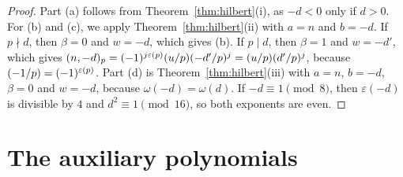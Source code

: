 \documentclass[11pt]{article}
\newcommand{\leg}[2]{\mathchoice{\biggl(\dfrac{#1}{#2}\biggr)}{(#1/#2)}{(#1/#2)}{(#1/#2)}}
\begin{document}
\begin{proof}
Part (a) follows from Theorem~\ref{thm:hilbert}(i), as $-d<0$ only if $d>0$. For (b) and (c), we apply Theorem~\ref{thm:hilbert}(ii) with $a=n$ and $b=-d$. If $p\nmid d$, then $\beta=0$ and $w=-d$, which gives (b). If $p\mid d$, then $\beta=1$ and $w=-d'$, which gives $(n,-d)_p=(-1)^{j\varepsilon(p)}\leg{u}{p}\leg{-d'}{p}^j=\leg{u}{p}\leg{d'}{p}^j$, because $\leg{-1}{p}=(-1)^{\varepsilon(p)}$. Part (d) is Theorem~\ref{thm:hilbert}(iii) with $a=n$, $b=-d$, $\beta=0$ and $w=-d$, because $\omega(-d)=\omega(d)$. If $-d\equiv1\pmod8$, then $\varepsilon(-d)$ is divisible by $4$ and $d^2\equiv1\pmod{16}$, so both exponents are even.
\end{proof}

\section{The auxiliary polynomials}
\end{document}
